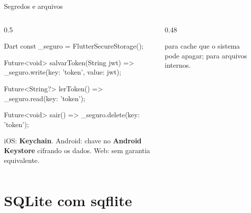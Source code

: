\documentclass[aspectratio=169,10pt]{beamer}
\begin{document}
\begin{frame}[fragile]{Segredos e arquivos}
  \begin{columns}[T]
    \begin{column}{0.5\textwidth}
\begin{codigo}[title=Armazenamento seguro]{Dart}
const _seguro = FlutterSecureStorage();

Future<void> salvarToken(String jwt) =>
    _seguro.write(key: 'token', value: jwt);

Future<String?> lerToken() =>
    _seguro.read(key: 'token');

Future<void> sair() =>
    _seguro.delete(key: 'token');
\end{codigo}
      \begin{conceito}
        iOS: \textbf{Keychain}. Android: chave no \textbf{Android Keystore} cifrando os dados. Web: sem garantia equivalente.
      \end{conceito}
    \end{column}
    \begin{column}{0.48\textwidth}
      \begin{dica}
         para cache que o sistema pode apagar;  para arquivos internos.
      \end{dica}
    \end{column}
  \end{columns}
\end{frame}

\section{SQLite com sqflite}
\end{document}
